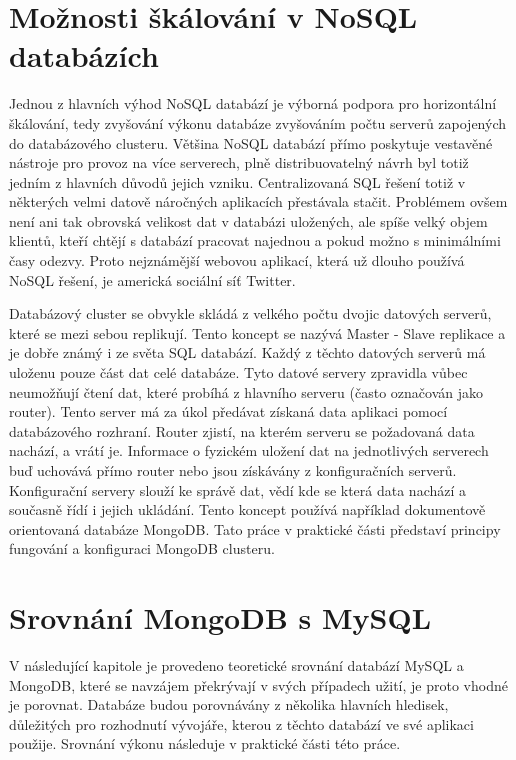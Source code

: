 \section{Možnosti škálování v NoSQL databázích}
Jednou z hlavních výhod NoSQL databází je výborná podpora pro horizontální škálování, tedy zvyšování výkonu databáze zvyšováním počtu serverů zapojených do databázového clusteru. Většina NoSQL databází přímo poskytuje vestavěné nástroje pro provoz na více serverech, plně distribuovatelný návrh byl totiž jedním z hlavních důvodů jejich vzniku. Centralizovaná SQL řešení totiž v některých velmi datově náročných aplikacích přestávala stačit. Problémem ovšem není ani tak obrovská velikost dat v databázi uložených, ale spíše velký objem klientů, kteří chtějí s databází pracovat najednou a pokud možno s minimálními časy odezvy. Proto nejznámější webovou aplikací, která už dlouho používá NoSQL řešení, je americká sociální síť Twitter. 

Databázový cluster se obvykle skládá z velkého počtu dvojic datových serverů, které se mezi sebou replikují. Tento koncept se nazývá Master - Slave replikace a je dobře známý i ze světa SQL databází. Každý z těchto datových serverů má uloženu pouze část dat celé databáze. Tyto datové servery zpravidla vůbec neumožňují čtení dat, které probíhá z hlavního serveru (často označován jako router). Tento server má za úkol předávat získaná data aplikaci pomocí databázového rozhraní. Router zjistí, na kterém serveru se požadovaná data nachází, a vrátí je. Informace o fyzickém uložení dat na jednotlivých serverech buď uchovává přímo router nebo jsou získávány z konfiguračních serverů. Konfigurační servery slouží ke správě dat, vědí kde se která data nachází a současně řídí i jejich ukládání. Tento koncept používá například dokumentově orientovaná databáze MongoDB. Tato práce v praktické části představí principy fungování a konfiguraci MongoDB clusteru. 

\section{Srovnání MongoDB s MySQL}
V následující kapitole je provedeno teoretické srovnání databází MySQL a MongoDB, které se navzájem překrývají v svých případech užití, je proto vhodné je porovnat. Databáze budou porovnávány z několika hlavních hledisek, důležitých pro rozhodnutí vývojáře, kterou z těchto databází ve své aplikaci použije. Srovnání výkonu následuje v praktické části této práce.

